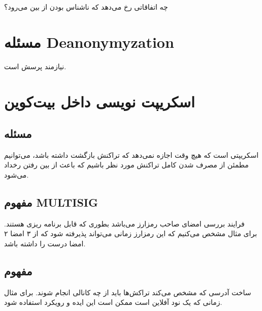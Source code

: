 \documentclass[10pt, a4paper]{article}
\begin{document}
چه اتفاقاتی رخ می‌دهد که ناشناس بودن از بین می‌رود؟

\section{مسئله Deanonymyzation}

نیازمند پرسش است.

\section{اسکریپت نویسی داخل بیت‌کوین}

\subsection{مسئله }

اسکریپتی است که هیچ وقت اجازه نمی‌دهد که تراکنش بازگشت داشته باشد، می‌توانیم
مطمئن از مصرف شدن کامل تراکنش مورد نظر باشیم که باعث از بین رفتن رخداد
 می‌شود.

\subsection{مفهوم MULTISIG}

فرایند بررسی امضای صاحب رمزارز می‌باشد بطوری که قابل برنامه ریزی هستند. برای
مثال مشخص می‌کنیم که این رمزارز زمانی می‌تواند پذیرفته شود که از ۳ امضا ۲ امضا
درست را داشته باشد.

\subsection{مفهوم }

ساخت آدرسی که مشخص می‌کند تراکش‌ها باید از چه کانالی انجام شوند. برای مثال زمانی
که یک نود آفلاین است ممکن است این ایده و رویکرد استفاده شود.
\end{document}
